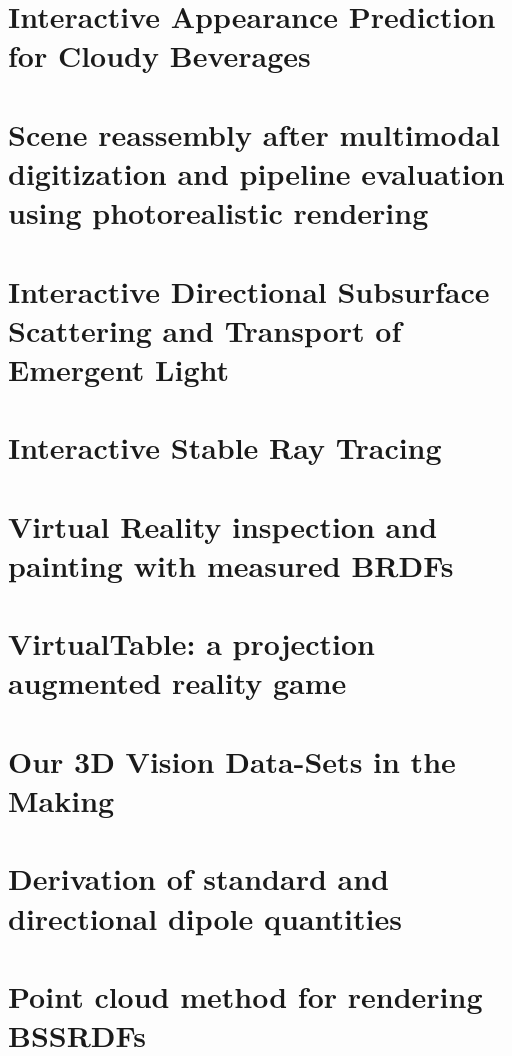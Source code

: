 \chapter{Interactive Appearance Prediction for Cloudy Beverages}
\label{sec:juice}
\label{sec:firstcontribution}

%
\chapter{Scene reassembly after multimodal digitization and pipeline evaluation using photorealistic rendering}
\label{sec:glass}

%
\chapter{Interactive Directional Subsurface Scattering and Transport of Emergent Light}
\label{sec:interactivedirsss}

%
\chapter{Interactive Stable Ray Tracing}
\label{sec:srt}

%
\chapter{Virtual Reality inspection and painting with measured BRDFs}
\label{sec:vrbrdf}
\label{sec:lastcontribution}

%
\chapter{VirtualTable: a projection augmented reality game}
\label{sec:virtualtable}

%
\chapter{Our 3D Vision Data-Sets in the Making}
\label{sec:robdataset}

%
\chapter{Derivation of standard and directional dipole quantities}
\label{sec:jensennote}

%
\chapter{Point cloud method for rendering BSSRDFs}
\label{sec:pointcloudnote}

%

